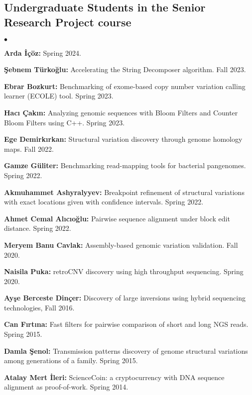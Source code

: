 \documentclass[margin,line]{res}
\newenvironment{list2}{
  \begin{list}{$\bullet$}{%
      \setlength{\itemsep}{0.1cm}
      \setlength{\parsep}{0in} \setlength{\parskip}{0in}
      \setlength{\topsep}{0in} \setlength{\partopsep}{0in} 
      \setlength{\leftmargin}{0.2in}}}{\end{list}}
\begin{document}
\begin{resume}
  \subsection{\small \sc Undergraduate Students in the Senior Research Project course}
  \begin{list2}
\item
    {\bf Arda İçöz:} Spring 2024.
\item
    {\bf Şebnem Türkoğlu:} Accelerating the String Decomposer algorithm. Fall 2023.
    \item
    {\bf Ebrar Bozkurt:} Benchmarking of exome-based copy number variation calling learner (ECOLE) tool. Spring 2023.
\item
    {\bf Hacı Çakın:} Analyzing genomic sequences with Bloom
Filters and Counter Bloom Filters using C++. Spring 2023.
   \item \textbf{Ege Demirkırkan:} Structural variation discovery through genome homology maps. Fall 2022.
   \item \textbf{Gamze Güliter:} Benchmarking read-mapping tools for bacterial pangenomes. Spring 2022.
 \item \textbf{Akmuhammet Ashyralyyev:} Breakpoint refinement of structural variations with exact locations given with confidence intervals. Spring 2022.
 \item \textbf{Ahmet Cemal Alıcıoğlu:} Pairwise sequence alignment under block edit distance. Spring 2022.
\item 
  {\bf Meryem Banu Cavlak:} Assembly-based genomic variation validation. Fall 2020.
  \item
    {\bf Naisila Puka:} retroCNV discovery using high throughput sequencing. Spring 2020.
  \item
    {\bf Ayşe Berceste Dinçer:} Discovery of large inversions using hybrid sequencing technologies, Fall 2016.
  \item
    {\bf Can Fırtına:} Fast filters for pairwise comparison of short and long NGS reads. Spring 2015.
  \item
    {\bf Damla Şenol:} Transmission patterns discovery of genome structural variations among generations of a family. Spring 2015.
  \item
    {\bf Atalay Mert İleri:} ScienceCoin: a cryptocurrency with DNA sequence alignment as proof-of-work. Spring 2014.
  \end{list2}
\vspace*{-.4cm}

\end{resume}
\end{document}
